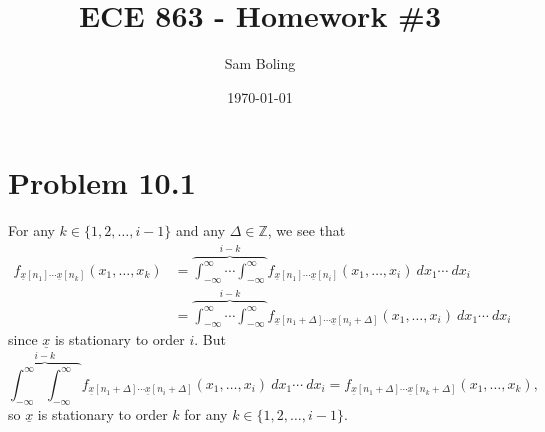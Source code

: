 \documentclass{article}
\title{ECE 863 - Homework \#3}
\author{Sam Boling}
\date{\today}
\begin{document}
\maketitle

\section*{Problem 10.1}
For any $k \in \{1, 2, \dots, i-1\}$ and any $\Delta \in \mathbb{Z}$,
we see that
\begin{align*}
  f_{\underline{x}[n_1] \cdots \underline{x}[n_k]}(x_1, \dots, x_k) &=
   \overbrace{\int_{-\infty}^{\infty} \cdots \int_{-\infty}^{\infty}}^{i-k}
     f_{\underline{x}[n_1]\cdots\underline{x}[n_i]}(x_1, \dots, x_i)
      ~dx_1 \cdots ~dx_i \\
&= \overbrace{\int_{-\infty}^{\infty} \cdots \int_{-\infty}^{\infty}}^{i-k}
     f_{\underline{x}[n_1 + \Delta]\cdots\underline{x}[n_i + \Delta]} 
     (x_1, \dots, x_i) ~dx_1 \cdots ~dx_i
\end{align*}
since $\underline{x}$ is stationary to order $i$. But
$$
 \overbrace{\int_{-\infty}^{\infty} \int_{-\infty}^{\infty}}^{i-k}
   f_{\underline{x}[n_1 + \Delta]\cdots\underline{x}[n_i + \Delta]} 
   (x_1, \dots, x_i) ~dx_1 \cdots ~dx_i
 = f_{\underline{x}[n_1 + \Delta]\cdots\underline{x}[n_k + \Delta]}
   (x_1, \dots, x_k),
$$
so $\underline{x}$ is stationary to order $k$ for any 
$k \in \{1, 2, \dots, i-1\}.$
\end{document}

